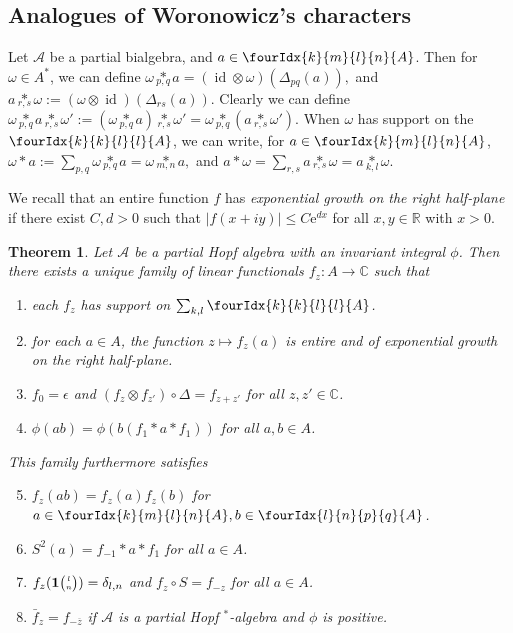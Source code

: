\documentclass[10pt]{article}
\DeclareMathOperator{\id}{id}
\newcommand{\C}{\mathbb{C}}
\newcommand{\R}{\mathbb{R}}
\newcommand{\Grt}[3]{#1{\tiny {\begin{pmatrix} #2\\#3\end{pmatrix}}}}
\newcommand{\UnitC}[2]{\Grt{\mathbf{1}}{#1}{#2}}
\newcommand{\Gr}[5]{\fourIdx{#2}{#4}{#3}{#5}{#1}}%
\newcommand{\aste}[1]{\underset{#1}{\ast}}
\newtheorem{Theorem}{Theorem}[section]
\theoremstyle{definition}
\numberwithin{equation}{section}
\begin{document}
\subsection{Analogues of Woronowicz's  characters}

Let $\mathscr{A}$ be a partial bialgebra, and $a\in \Gr{A}{k}{l}{m}{n}$. Then for $\omega \in A^*$, we can define
$\omega \aste{p,q} a = (\id \otimes \omega) (\Delta_{pq}(a)),$ and $a \aste{r,s}
\omega:=(\omega \otimes \id)(\Delta_{rs}(a)).$ Clearly we can define
$ \omega \aste{p,q} a \aste{r,s}
\omega':= (\omega \aste{p,q} a)\aste{r,s} \omega' = \omega \aste{p,q}(a \aste{r,s} \omega').$
When $\omega$ has support on the $\Gr{A}{k}{l}{k}{l}$, we can write, for $a\in \Gr{A}{k}{l}{m}{n}$, $\omega\ast a := \sum_{p,q} \omega\aste{p,q}a = \omega\aste{m,n}a,$ and $a\ast \omega = \sum_{r,s} a\aste{r,s}\omega = a\aste{k,l}\omega.$ 

We recall that an entire function $f$ has \emph{exponential growth
  on the right half-plane} if there exist $C,d>0$ such that $|f(x+iy)|\leq
C\mathrm{e}^{dx}$  for all $x,y\in \R$ with $x>0$. 

\begin{Theorem} \label{thm:rep-characters} Let $\mathscr{A}$ be a
  partial Hopf algebra with an invariant integral $\phi$.  Then there
  exists a unique family of linear functionals $f_{z} \colon A\to \C$
  such that
\begin{enumerate}[label={(\arabic*)}]
  \item each $f_z$ has support on $\sum_{k,l}\Gr{A}{k}{l}{k}{l}$.
  \item for each $a\in A$, the function $z\mapsto f_{z}(a)$ is entire
    and of exponential growth on the right half-plane.
  \item $f_{0} = \epsilon$ and $(f_{z} \otimes f_{z'}) \circ 
    \Delta= f_{z+z'}$ for all $z,z' \in \C$.
  \item $\phi(ab)=\phi(b(f_{1} \ast a \ast f_{1}))$ for all $a,b\in A$.
  \end{enumerate}
  This family furthermore satisfies
  \begin{enumerate}[label={(\arabic*)}]\setcounter{enumi}{4}
  \item $f_z(ab) = f_z(a)f_z(b)$ for $a\in \Gr{A}{k}{l}{m}{n},b\in \Gr{A}{l}{p}{n}{q}$. 
  \item $S^{2}(a)=f_{-1} \ast a \ast f_{1}$ for all $a\in A$.
  \item $f_{z}(\UnitC{l}{n})=\delta_{l,n}$ and $f_{z} \circ S = f_{-z}$ for all $a\in A$.
  \item $\bar{f}_{z}=f_{-\overline{z}}$ if $\mathscr{A}$ is a partial
    Hopf $^*$-algebra and $\phi$ is positive.
\end{enumerate}
\end{Theorem}
\end{document}
